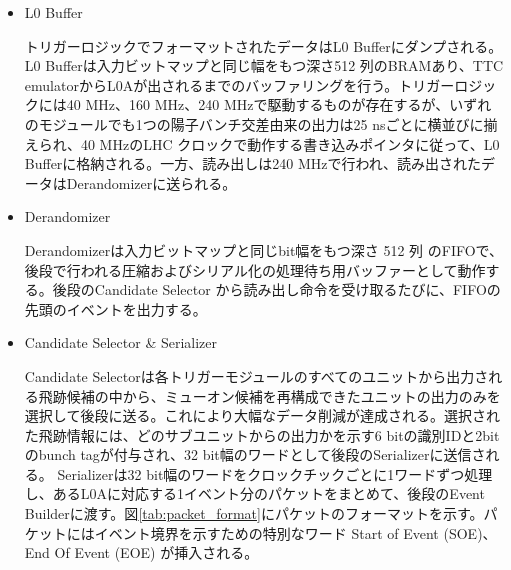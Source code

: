 \begin{itemize}
    \item L0 Buffer　　
    \par
    トリガーロジックでフォーマットされたデータはL0 Bufferにダンプされる。L0 Bufferは入力ビットマップと同じ幅をもつ深さ512 列のBRAMあり、TTC emulatorからL0Aが出されるまでのバッファリングを行う。トリガーロジックには40 MHz、160 MHz、240 MHzで駆動するものが存在するが、いずれのモジュールでも1つの陽子バンチ交差由来の出力は25 nsごとに横並びに揃えられ、40 MHzのLHC クロックで動作する書き込みポインタに従って、L0 Bufferに格納される。一方、読み出しは240 MHzで行われ、読み出されたデータはDerandomizerに送られる。

    \item Derandomizer　　
    \par
    Derandomizerは入力ビットマップと同じbit幅をもつ深さ 512 列 のFIFOで、後段で行われる圧縮およびシリアル化の処理待ち用バッファーとして動作する。後段のCandidate Selector から読み出し命令を受け取るたびに、FIFOの先頭のイベントを出力する。

    \item Candidate Selector \& Serializer　　
    \par
    Candidate Selectorは各トリガーモジュールのすべてのユニットから出力される飛跡候補の中から、ミューオン候補を再構成できたユニットの出力のみを選択して後段に送る。これにより大幅なデータ削減が達成される。選択された飛跡情報には、どのサブユニットからの出力かを示す6 bitの識別IDと2bit のbunch tagが付与され、32 bit幅のワードとして後段のSerializerに送信される。
    Serializerは32 bit幅のワードをクロックチックごとに1ワードずつ処理し、あるL0Aに対応する1イベント分のパケットをまとめて、後段のEvent Builderに渡す。図\ref{tab:packet_format}にパケットのフォーマットを示す。パケットにはイベント境界を示すための特別なワード Start of Event (SOE)、End Of Event (EOE) が挿入される。


\end{itemize}
